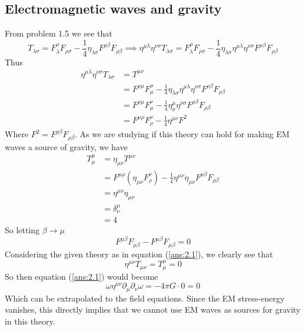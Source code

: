 \documentclass{article}
\begin{document}
	\subsection{Electromagnetic waves and gravity}
	From problem 1.5 we see that
	\begin{equation}
		\label{2.3.1}
		T_{\lambda\sigma} = F^\rho_\lambda F_{\rho\sigma} - \frac14 \eta_{\lambda\sigma} F^{\rho\beta} F_{\rho\beta} \implies \eta^{\mu\lambda} \eta^{\nu\sigma} T_{\lambda \sigma} = F^\rho_\lambda F_{\rho\sigma} - \frac14 \eta_{\lambda\sigma} \eta^{\mu\lambda}\eta^{\nu\sigma} F^{\rho\beta} F_{\rho\beta}
	\end{equation}
	Thus
	\begin{align*}
		\eta^{\mu\lambda} \eta^{\nu\sigma} T_{\lambda\sigma} &=  T^{\mu\nu} \\ &= F^{\rho\mu} F_{\mu}^{\sigma} - \frac14 \eta_{\lambda\sigma} \eta^{\mu\lambda}\eta^{\nu\sigma} F^{\rho\beta} F_{\rho\beta} \\ 
		&= F^{\rho\mu} F_{\mu}^{\nu} - \frac14 \eta_{\sigma}^\mu \eta^{\nu\sigma} F^{\rho\beta} F_{\rho\beta} \\
		&= F^{\mu\rho} F^{\nu}_{\rho} - \frac14 \eta^{\mu\nu} F^2 
	\end{align*}
	Where $F^2 = F^{\rho \beta} F_{\rho\beta}$. As we are studying if this theory can hold for making EM waves a source of gravity, we have 
	\begin{align*}
		T^{\mu}_{\mu} &= \eta_{\mu\nu} T^{\mu\nu} \\
		&= F^{\mu\rho} \left( \eta_{\mu\nu} F^\nu_\rho \right) - \frac14 \eta^{\mu\nu} \eta_{\mu\nu} F^{\rho\beta} F_{\rho\beta} \\
		&= \eta^{\mu\nu} \eta_{\mu\nu} \\
		&= \delta_\nu^\mu \\
		&= 4
	\end{align*}
	So letting $\beta\to \mu$
	\begin{equation}
		F^{\mu\beta} F_{\mu\beta} - F^{\mu\beta} F_{\mu\beta} = 0
	\end{equation}
	Considering the given theory as in equation (\ref{ans:2.1}), we clearly see that
	$$ \eta^{\mu\nu} T_{\mu\nu} = T_\mu^\mu = 0$$
	So then equation (\ref{ans:2.1}) would become
	\begin{equation}
		\label{ans:2.3}
		\boxed{\omega \eta^{\mu\nu} \partial_\mu \partial_\nu \omega = - 4\pi G \cdot 0 = 0}
	\end{equation}
	Which can be extrapolated to the field equations. Since the EM stress-energy vanishes, this directly implies that we cannot use EM waves as sources for gravity in this theory.
	\pagebreak
\end{document}
